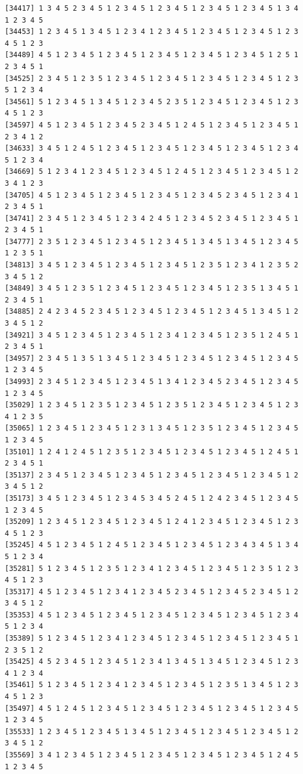\documentclass[
  english,
]{book}
\begin{document}
\begin{verbatim}
[34417] 1 3 4 5 2 3 4 5 1 2 3 4 5 1 2 3 4 5 1 2 3 4 5 1 2 3 4 5 1 3 4 1 2 3 4 5
[34453] 1 2 3 4 5 1 3 4 5 1 2 3 4 1 2 3 4 5 1 2 3 4 5 1 2 3 4 5 1 2 3 4 5 1 2 3
[34489] 4 5 1 2 3 4 5 1 2 3 4 5 1 2 3 4 5 1 2 3 4 5 1 2 3 4 5 1 2 5 1 2 3 4 5 1
[34525] 2 3 4 5 1 2 3 5 1 2 3 4 5 1 2 3 4 5 1 2 3 4 5 1 2 3 4 5 1 2 3 5 1 2 3 4
[34561] 5 1 2 3 4 5 1 3 4 5 1 2 3 4 5 2 3 5 1 2 3 4 5 1 2 3 4 5 1 2 3 4 5 1 2 3
[34597] 4 5 1 2 3 4 5 1 2 3 4 5 2 3 4 5 1 2 4 5 1 2 3 4 5 1 2 3 4 5 1 2 3 4 1 2
[34633] 3 4 5 1 2 4 5 1 2 3 4 5 1 2 3 4 5 1 2 3 4 5 1 2 3 4 5 1 2 3 4 5 1 2 3 4
[34669] 5 1 2 3 4 1 2 3 4 5 1 2 3 4 5 1 2 4 5 1 2 3 4 5 1 2 3 4 5 1 2 3 4 1 2 3
[34705] 4 5 1 2 3 4 5 1 2 3 4 5 1 2 3 4 5 1 2 3 4 5 2 3 4 5 1 2 3 4 1 2 3 4 5 1
[34741] 2 3 4 5 1 2 3 4 5 1 2 3 4 2 4 5 1 2 3 4 5 2 3 4 5 1 2 3 4 5 1 2 3 4 5 1
[34777] 2 3 5 1 2 3 4 5 1 2 3 4 5 1 2 3 4 5 1 3 4 5 1 3 4 5 1 2 3 4 5 1 2 3 5 1
[34813] 3 4 5 1 2 3 4 5 1 2 3 4 5 1 2 3 4 5 1 2 3 5 1 2 3 4 1 2 3 5 2 3 4 5 1 2
[34849] 3 4 5 1 2 3 5 1 2 3 4 5 1 2 3 4 5 1 2 3 4 5 1 2 3 5 1 3 4 5 1 2 3 4 5 1
[34885] 2 4 2 3 4 5 2 3 4 5 1 2 3 4 5 1 2 3 4 5 1 2 3 4 5 1 3 4 5 1 2 3 4 5 1 2
[34921] 3 4 5 1 2 3 4 5 1 2 3 4 5 1 2 3 4 1 2 3 4 5 1 2 3 5 1 2 4 5 1 2 3 4 5 1
[34957] 2 3 4 5 1 3 5 1 3 4 5 1 2 3 4 5 1 2 3 4 5 1 2 3 4 5 1 2 3 4 5 1 2 3 4 5
[34993] 2 3 4 5 1 2 3 4 5 1 2 3 4 5 1 3 4 1 2 3 4 5 2 3 4 5 1 2 3 4 5 1 2 3 4 5
[35029] 1 2 3 4 5 1 2 3 5 1 2 3 4 5 1 2 3 5 1 2 3 4 5 1 2 3 4 5 1 2 3 4 1 2 3 5
[35065] 1 2 3 4 5 1 2 3 4 5 1 2 3 1 3 4 5 1 2 3 5 1 2 3 4 5 1 2 3 4 5 1 2 3 4 5
[35101] 1 2 4 1 2 4 5 1 2 3 5 1 2 3 4 5 1 2 3 4 5 1 2 3 4 5 1 2 4 5 1 2 3 4 5 1
[35137] 2 3 4 5 1 2 3 4 5 1 2 3 4 5 1 2 3 4 5 1 2 3 4 5 1 2 3 4 5 1 2 3 4 5 1 2
[35173] 3 4 5 1 2 3 4 5 1 2 3 4 5 3 4 5 2 4 5 1 2 4 2 3 4 5 1 2 3 4 5 1 2 3 4 5
[35209] 1 2 3 4 5 1 2 3 4 5 1 2 3 4 5 1 2 4 1 2 3 4 5 1 2 3 4 5 1 2 3 4 5 1 2 3
[35245] 4 5 1 2 3 4 5 1 2 4 5 1 2 3 4 5 1 2 3 4 5 1 2 3 4 3 4 5 1 3 4 5 1 2 3 4
[35281] 5 1 2 3 4 5 1 2 3 5 1 2 3 4 1 2 3 4 5 1 2 3 4 5 1 2 3 5 1 2 3 4 5 1 2 3
[35317] 4 5 1 2 3 4 5 1 2 3 4 1 2 3 4 5 2 3 4 5 1 2 3 4 5 2 3 4 5 1 2 3 4 5 1 2
[35353] 4 5 1 2 3 4 5 1 2 3 4 5 1 2 3 4 5 1 2 3 4 5 1 2 3 4 5 1 2 3 4 5 1 2 3 4
[35389] 5 1 2 3 4 5 1 2 3 4 1 2 3 4 5 1 2 3 4 5 1 2 3 4 5 1 2 3 4 5 1 2 3 5 1 2
[35425] 4 5 2 3 4 5 1 2 3 4 5 1 2 3 4 1 3 4 5 1 3 4 5 1 2 3 4 5 1 2 3 4 1 2 3 4
[35461] 5 1 2 3 4 5 1 2 3 4 1 2 3 4 5 1 2 3 4 5 1 2 3 5 1 3 4 5 1 2 3 4 5 1 2 3
[35497] 4 5 1 2 4 5 1 2 3 4 5 1 2 3 4 5 1 2 3 4 5 1 2 3 4 5 1 2 3 4 5 1 2 3 4 5
[35533] 1 2 3 4 5 1 2 3 4 5 1 3 4 5 1 2 3 4 5 1 2 3 4 5 1 2 3 4 5 1 2 3 4 5 1 2
[35569] 3 4 1 2 3 4 5 1 2 3 4 5 1 2 3 4 5 1 2 3 4 5 1 2 3 4 5 1 2 4 5 1 2 3 4 5

\end{verbatim}
\end{document}
